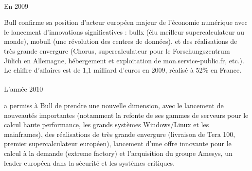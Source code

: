 \documentclass[11pt]{article}
\begin{document}
		\paragraph{}
		\begin{bf}En 2009\end{bf} Bull confirme sa position d’acteur européen majeur de l’économie numérique avec le 
		lancement d’innovations significatives : bullx (élu meilleur supercalculateur au monde), mobull 
		(une révolution des centres de données), et des réalisations de très grande envergure (Chorus, supercalculateur pour le 
		Forschungszentrum Jülich en Allemagne, hébergement et exploitation de mon.service-public.fr, etc.). Le chiffre 
		d'affaires est de 1,1 milliard d'euros en 2009, réalisé à 52\% en France.
		\paragraph{}
		\begin{bf}L’année 2010\end{bf} a permiss à Bull de prendre une nouvelle dimension, avec le lancement de nouveautés 
		importantes (notamment la refonte de ses gammes de serveurs pour le calcul haute performance, les grands systèmes 
		Windows/Linux et les mainframes), des réalisations de très grande envergure (livraison de Tera 100, premier 
		supercalculateur européen), lancement d’une offre innovante pour le calcul à la demande (extreme factory) et 
		l’acquisition du groupe Amesys, un leader européen dans la sécurité et les systèmes critiques.
\end{document}
